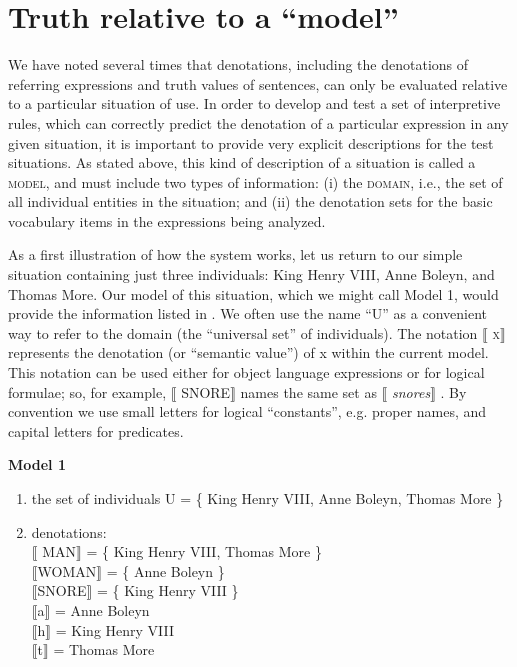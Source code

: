 \section{Truth relative to a “model”}\label{sec:} %

We have noted several times that denotations, including the denotations of referring expressions and truth values of sentences, can only be evaluated relative to a particular situation of use. In order to develop and test a set of interpretive rules, which can correctly predict the denotation of a particular expression in any given situation, it is important to provide very explicit descriptions for the test situations. As stated above, this kind of description of a situation is called a \textsc{model}, and must include two types of information: (i) the \textsc{domain}, i.e., the set of all individual entities in the situation; and (ii) the denotation sets for the basic vocabulary items in the expressions being analyzed.



As a first illustration of how the system works, let us return to our simple situation containing just three individuals: King Henry VIII, Anne Boleyn, and Thomas More. Our model of this situation, which we might call Model 1, would provide the information listed in . We often use the name “U” as a convenient way to refer to the domain (the “universal set” of individuals). The notation \textsc{$\llbracket$ x}$\rrbracket$  represents the denotation (or “semantic value”) of x within the current model. This notation can be used either for object language expressions or for logical formulae; so, for example, $\llbracket$ SNORE$\rrbracket$  names the same set as $\llbracket$ \textit{snores}$\rrbracket$ . By convention we use small letters for logical “constants”, e.g. proper names, and capital letters for predicates.


\textbf{Model 1}

\begin{enumerate}
\item the set of individuals U = \{ King Henry VIII, Anne Boleyn, Thomas More \}
\item denotations\textsc{:\\
{}$\llbracket$ }\textsc{MAN}$\rrbracket$  = \{ King Henry VIII, Thomas More \}\\
\textsc{$\llbracket$}WOMAN$\rrbracket$  = \{ Anne Boleyn \}\\
\textsc{$\llbracket$}SNORE$\rrbracket$  = \{ King Henry VIII \}\\
\textsc{$\llbracket$}a$\rrbracket$  = Anne Boleyn\\
\textsc{$\llbracket$}h$\rrbracket$  = King Henry VIII\\
\textsc{$\llbracket$}t$\rrbracket$  = Thomas More
\end{enumerate}

